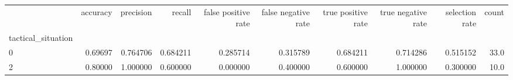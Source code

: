 \begin{tabular}{lrrrrrrrrr}
\toprule
{} &  accuracy &  precision &    recall &  false positive rate &  false negative rate &  true positive rate &  true negative rate &  selection rate &  count \\
tactical\_situation &           &            &           &                      &                      &                     &                     &                 &        \\
\midrule
0                  &   0.69697 &   0.764706 &  0.684211 &             0.285714 &             0.315789 &            0.684211 &            0.714286 &        0.515152 &   33.0 \\
2                  &   0.80000 &   1.000000 &  0.600000 &             0.000000 &             0.400000 &            0.600000 &            1.000000 &        0.300000 &   10.0 \\
\bottomrule
\end{tabular}

